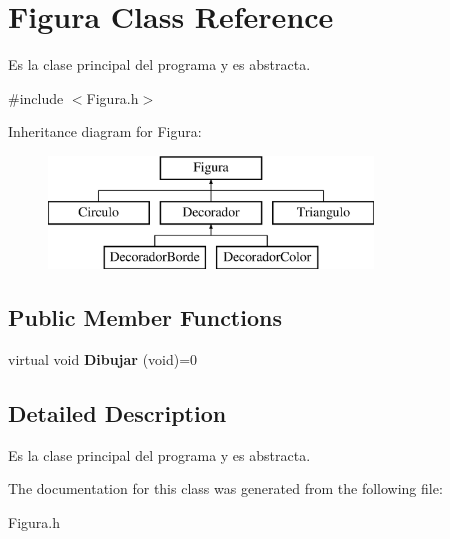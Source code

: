 \hypertarget{class_figura}{\section{Figura Class Reference}
\label{class_figura}
}


Es la clase principal del programa y es abstracta.  




{\ttfamily \#include $<$Figura.\-h$>$}

Inheritance diagram for Figura\-:\begin{figure}[H]
\begin{center}
\leavevmode
\includegraphics[height=3.000000cm]{class_figura}
\end{center}
\end{figure}
\subsection*{Public Member Functions}
\begin{DoxyCompactItemize}
\item 
\hypertarget{class_figura_a327eaf6c0b47fe3263763b83d3474162}{virtual void {\bfseries Dibujar} (void)=0}\label{class_figura_a327eaf6c0b47fe3263763b83d3474162}

\end{DoxyCompactItemize}


\subsection{Detailed Description}
Es la clase principal del programa y es abstracta. 

The documentation for this class was generated from the following file\-:\begin{DoxyCompactItemize}
\item 
Figura.\-h\end{DoxyCompactItemize}
